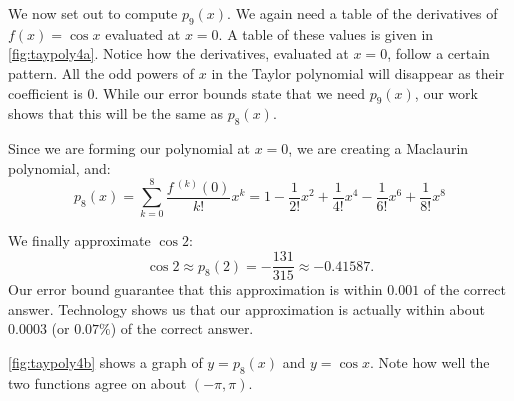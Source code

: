 \begin{example}
We now set out to compute $p_9(x)$. We again need a table of the derivatives of $f(x)=\cos x$ evaluated at $x=0$. A table of these values is given in \autoref{fig:taypoly4a}. Notice how the derivatives, evaluated at $x=0$, follow a certain pattern. All the odd powers of $x$ in the Taylor polynomial will disappear as their coefficient is 0. While our error bounds state that we need $p_9(x)$, our work shows that this will be the same as $p_8(x)$.

Since we are forming our polynomial at $x=0$, we are creating a Maclaurin polynomial, and:\vspace{-.3\baselineskip}
\[
	p_8(x) = \sum_{k=0}^8\frac{f\,^{(k)}(0)}{k!}x^k
	=  1-\frac{1}{2!}x^2+\frac{1}{4!}x^4-\frac{1}{6!}x^6+\frac{1}{8!}x^8
\]

We finally approximate $\cos 2$:
\[\cos 2 \approx p_8(2) = -\frac{131}{315} \approx -0.41587.\]
%
%
Our error bound guarantee that this approximation is within $0.001$ of the correct answer. Technology shows us that our approximation is actually within about $0.0003$ (or $0.07\%$) of the correct answer.

\autoref{fig:taypoly4b} shows a graph of $y=p_8(x)$ and $y=\cos x$. Note how well the two functions agree on about $(-\pi,\pi)$.
\end{example}

